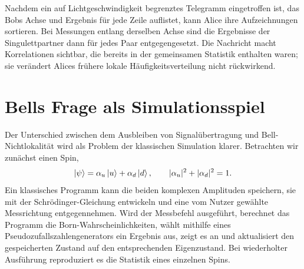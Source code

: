 Nachdem ein auf Lichtgeschwindigkeit begrenztes Telegramm eingetroffen ist, das Bobs Achse und Ergebnis für jede Zeile auflistet, kann Alice ihre Aufzeichnungen sortieren. Bei Messungen entlang derselben Achse sind die Ergebnisse der Singulettpartner dann für jedes Paar entgegengesetzt. Die Nachricht macht Korrelationen sichtbar, die bereits in der gemeinsamen Statistik enthalten waren; sie verändert Alices frühere lokale Häufigkeitsverteilung nicht rückwirkend.

\begin{classroomqa}
\end{classroomqa}

\begin{classroomqa}
\end{classroomqa}

\section{Bells Frage als Simulationsspiel}

Der Unterschied zwischen dem Ausbleiben von Signalübertragung und Bell-Nichtlokalität wird als Problem der klassischen Simulation klarer. Betrachten wir zunächst einen Spin,
\begin{equation}
\left\lvert\psi\right\rangle=\alpha_u\left\lvert u\right\rangle+\alpha_d\left\lvert d\right\rangle,
\qquad
|\alpha_u|^2+|\alpha_d|^2=1.
\end{equation}
Ein klassisches Programm kann die beiden komplexen Amplituden speichern, sie mit der Schr\"odinger-Gleichung entwickeln und eine vom Nutzer gewählte Messrichtung entgegennehmen. Wird der Messbefehl ausgeführt, berechnet das Programm die Born-Wahrscheinlichkeiten, wählt mithilfe eines Pseudozufallszahlengenerators ein Ergebnis aus, zeigt es an und aktualisiert den gespeicherten Zustand auf den entsprechenden Eigenzustand. Bei wiederholter Ausführung reproduziert es die Statistik eines einzelnen Spins.

